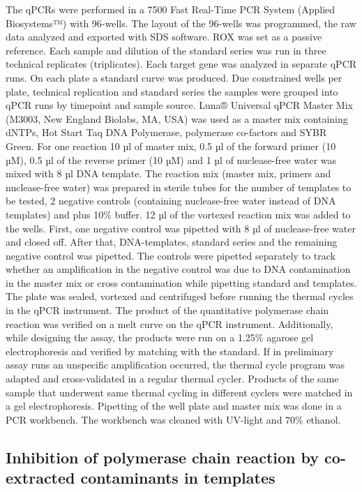 \documentclass[twoside,12pt,final]{ucthesis-CA2012}
\begin{document}
\begin{ucmainmatter}
The qPCRs were performed in a 7500 Fast Real-Time PCR System (Applied Biosystems™) with 96-wells. The layout of the 96-wells was programmed, the raw data analyzed and exported with SDS software. ROX was set as a passive reference. Each sample and dilution of the standard series was run in three technical replicates (triplicates). Each target gene was analyzed in separate qPCR runs. On each plate a standard curve was produced. Due constrained wells per plate, technical replication and standard series the samples were grouped into qPCR runs by timepoint and sample source. Luna® Universal qPCR Master Mix (M3003, New England Biolabs, MA, USA) was used as a master mix containing dNTPs, Hot Start Taq DNA Polymerase, polymerase co-factors and SYBR Green. For one reaction 10 µl of master mix, 0.5 µl of the forward primer (10 µM), 0.5 µl of the reverse primer (10 µM) and 1 µl of nuclease-free water was mixed with 8 µl DNA template. The reaction mix (master mix, primers and nuclease-free water) was prepared in sterile tubes for the number of templates to be tested, 2 negative controls (containing nuclease-free water instead of DNA templates) and plus 10\% buffer. 12 µl of the vortexed reaction mix was added to the wells. First, one negative control was pipetted with 8 µl of nuclease-free water and closed off. After that, DNA-templates, standard series and the remaining negative control was pipetted. The controls were pipetted separately to track whether an amplification in the negative control was due to DNA contamination in the master mix or cross contamination while pipetting standard and templates. The plate was sealed, vortexed and centrifuged before running the thermal cycles in the qPCR instrument. The product of the quantitative polymerase chain reaction was verified on a melt curve on the qPCR instrument. Additionally, while designing the assay, the products were run on a 1.25\% agarose gel electrophoresis and verified by matching with the standard. If in preliminary assay runs an unspecific amplification occurred, the thermal cycle program was adapted and cross-validated in a regular thermal cycler. Products of the same sample that underwent same thermal cycling in different cyclers were matched in a gel electrophoresis. Pipetting of the well plate and master mix was done in a PCR workbench. The workbench was cleaned with UV-light and 70\% ethanol.

\hypertarget{inhibition-of-polymerase-chain-reaction-by-co-extracted-contaminants-in-templates}{%
\subsection{Inhibition of polymerase chain reaction by co-extracted contaminants in templates}\label{inhibition-of-polymerase-chain-reaction-by-co-extracted-contaminants-in-templates}}


\end{ucmainmatter}
\end{document}
